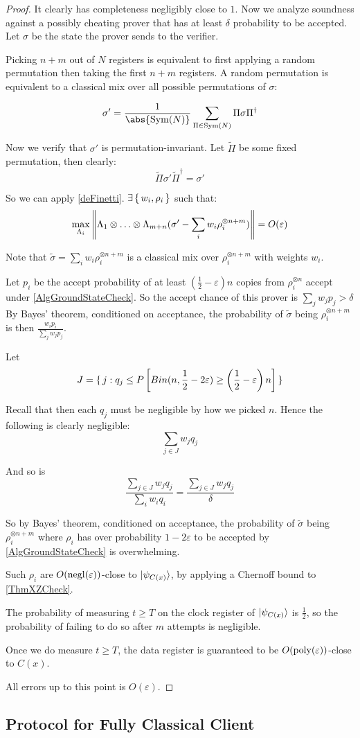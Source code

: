 \begin{proof}
	It clearly has completeness negligibly close to $1$. Now we analyze soundness against a possibly cheating prover that has at least $\delta$ probability to be accepted. Let $\sigma$ be the state the prover sends to the verifier.

	Picking $n+m$ out of $N$ registers is equivalent to first applying a random permutation then taking the first $n+m$ registers.
	A random permutation is equivalent to a classical mix over all possible permutations of $\sigma$:

	$$\sigma'=\frac{1}{\abs{\Sym(N)}}\sum_{\Pi\in\Sym(N)}\Pi\sigma\Pi^\dagger$$

	Now we verify that $\sigma'$ is permutation-invariant.
	Let $\tilde{\Pi}$ be some fixed permutation, then clearly:
	$$\tilde{\Pi}\sigma'\tilde{\Pi}^\dagger=\sigma'$$

	So we can apply \autoref{deFinetti}. $\exists\set{w_i, \rho_i}$ such that:
	$$\max_{\Lambda_i}\left\lVert\Lambda_1\otimes\ldots\otimes\Lambda_{m+n}(\sigma'-\sum_i w_i\rho_i^{\otimes n+m})\right\rVert=O(\varepsilon)$$

	Note that $\tilde\sigma=\sum_i w_i\rho_i^{\otimes n+m}$ is a classical mix over $\rho_i^{\otimes n+m}$ with weights $w_i$.

	Let $p_i$ be the accept probability of at least $(\frac{1}{2}-\varepsilon)n$ copies from $\rho_i^{\otimes n}$ accept under \autoref{AlgGroundStateCheck}.
	So the accept chance of this prover is $\sum_j w_j p_j>\delta$
	By Bayes' theorem, conditioned on acceptance, the probability of $\tilde{\sigma}$ being $\rho_i^{\otimes n+m}$ is then $\frac{w_i p_i}{\sum_j w_j p_j}$.

	Let
	$$J=\set{j:q_j\leq P\left[Bin(n, \frac{1}{2}-2\varepsilon)\geq\left(\frac{1}{2}-\varepsilon\right)n\right]}$$

	Recall that then each $q_j$ must be negligible by how we picked $n$. Hence the following is clearly negligible:
	$$\sum_{j\in J} w_j q_j$$

	And so is
	$$\frac{\sum_{j\in J} w_j q_j}{\sum_i w_i q_i}=\frac{\sum_{j\in J} w_j q_j}{\delta}$$

	So by Bayes' theorem, conditioned on acceptance, the probability of $\tilde{\sigma}$ being $\rho_i^{\otimes n+m}$ where $\rho_i$ has over probability $1-2\varepsilon$ to be accepted by \autoref{AlgGroundStateCheck} is overwhelming.

	Such $\rho_i$ are $O(\operatorname{negl}(\varepsilon))$-close to $\ket{\psi_{C(x)}}$, by applying a Chernoff bound to \autoref{ThmXZCheck}.

	The probability of measuring $t\geq T$ on the clock register of $\ket{\psi_{C(x)}}$ is $\frac{1}{2}$, so the probability of failing to do so after $m$ attempts is negligible.

	Once we do measure $t\geq T$, the data register is guaranteed to be $O(\operatorname*{\operatorname{poly}}(\varepsilon))$-close to $C(x)$.

	All errors up to this point is $O(\varepsilon)$.
\end{proof}

\subsection{Protocol for Fully Classical Client}


